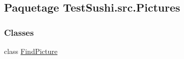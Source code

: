 \hypertarget{namespaceTestSushi_1_1src_1_1Pictures}{}\subsection{Paquetage Test\+Sushi.\+src.\+Pictures}
\label{namespaceTestSushi_1_1src_1_1Pictures}
\subsubsection*{Classes}
\begin{DoxyCompactItemize}
\item 
class \hyperlink{classTestSushi_1_1src_1_1Pictures_1_1FindPicture}{Find\+Picture}
\end{DoxyCompactItemize}
